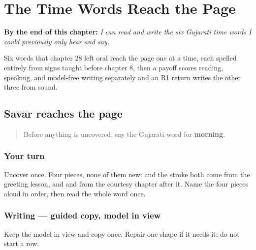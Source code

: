 
\chapter{The Time Words Reach the Page}
\label{ch:gu-time-words-written}

\begin{chapteropening}
\textbf{By the end of this chapter:} \emph{I can read and write the six Gujarati time words I could previously only hear and say.}

Six words that chapter 28 left oral reach the page one at a time, each spelled entirely from signs taught before chapter 8, then a payoff scores reading, speaking, and model-free writing separately and an R1 return writes the other three from sound.
\end{chapteropening}

\section[Practice]{Savār reaches the page}

\label{lesson:GU-C25-savaar}



\begin{quote}
Before anything is uncovered, say the Gujarati word for \textbf{morning}.
\end{quote}

\subsection*{Your turn}
Uncover \textbf{} once. Four pieces, none of them new: \textbf{} and the \textbf{} stroke both come from the greeting lesson, and \textbf{} and \textbf{} from the courtesy chapter after it. Name the four pieces aloud in order, then read the whole word once.

\subsection*{Writing — guided copy, model in view}
Keep the model in view and copy \textbf{} once. Repair one shape if it needs it; do not start a row.

